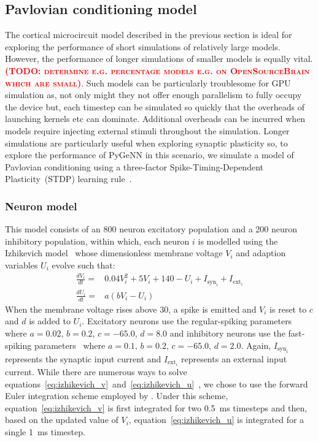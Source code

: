 \documentclass[utf8]{frontiersSCNS} %
\newcommand{\todo}[1]{\textbf{\textsc{\textcolor{red}{(TODO: #1)}}}}
\begin{document}
\subsection{Pavlovian conditioning model}
\label{sec:methods/izhikevich}
The cortical microcircuit model described in the previous section is ideal for exploring the performance of short simulations of relatively large models.
However, the performance of longer simulations of smaller models is equally vital.\todo{determine e.g. percentage models e.g. on OpenSourceBrain which are small}.
Such models can be particularly troublesome for GPU simulation as, not only might they not offer enough parallelism to fully occupy the device but, each timestep can be simulated so quickly that the overheads of launching kernels etc can dominate.
Additional overheads can be incurred when models require injecting external stimuli throughout the simulation.
Longer simulations are particularly useful when exploring synaptic plasticity so, to explore the performance of PyGeNN in this scenario, we simulate a model of Pavlovian conditioning using a three-factor Spike-Timing-Dependent Plasticity~(STDP) learning rule~\citep{Izhikevich2007}.

\subsubsection{Neuron model}
This model consists of an \num{800} neuron excitatory population and a \num{200} neuron inhibitory population, within which, each neuron $i$ is modelled using the Izhikevich model~\citep{Izhikevich2003a} whose dimensionless membrane voltage $V_{i}$ and adaption variables $U_i$ evolve such that:
%
\begin{align}
    \frac{dV_i}{dt} = & 0.04 V_i^2 + 5V_i + 140 - U_i + I_{\text{syn}_{i}} + I_{\text{ext}_{i}} \label{eq:izhikevich_v} \\
    \frac{dU_i}{dt} = & a(b V_i - U_i) \label{eq:izhikevich_u}
\end{align}
%
When the membrane voltage rises above 30, a spike is emitted and $V_i$ is reset to $c$ and $d$ is added to $U_i$.
Excitatory neurons use the regular-spiking parameters~\citep{Izhikevich2003a} where $a = 0.02$, $b = 0.2$, $c = -65.0$, $d = 8.0$ and inhibitory neurons use the fast-spiking parameters~\citep{Izhikevich2003a} where $a = 0.1$, $b = 0.2$, $c = -65.0$, $d = 2.0$.
Again, $I_{\text{syn}_{i}}$ represents the synaptic input current and $I_{\text{ext}_i}$ represents an external input current.
While there are numerous ways to solve equations~\ref{eq:izhikevich_v}~and~\ref{eq:izhikevich_u}~\citep{Humphries2007,Hopkins2015,Pauli2018}, we chose to use the forward Euler integration scheme employed by \citet{Izhikevich2003a}.
Under this scheme, equation~\ref{eq:izhikevich_v} is first integrated for two \SI{0.5}{\milli\second} timesteps and then, based on the updated value of $V_i$, equation~\ref{eq:izhikevich_u} is integrated for a single \SI{1}{\milli\second} timestep.
\end{document}
